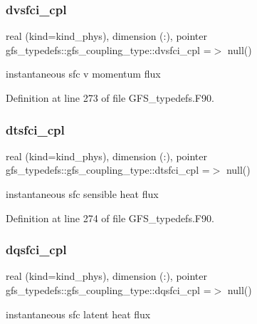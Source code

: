 \subsubsection{dvsfci\+\_\+cpl}
{\footnotesize\ttfamily real (kind=kind\+\_\+phys), dimension (\+:), pointer gfs\+\_\+typedefs\+::gfs\+\_\+coupling\+\_\+type\+::dvsfci\+\_\+cpl =$>$ null()}



instantaneous sfc v momentum flux 



Definition at line 273 of file G\+F\+S\+\_\+typedefs.\+F90.

\mbox{\label{structgfs__typedefs_1_1gfs__coupling__type_a020368408935772be27eaa098c17ce2e}} 
\subsubsection{dtsfci\+\_\+cpl}
{\footnotesize\ttfamily real (kind=kind\+\_\+phys), dimension (\+:), pointer gfs\+\_\+typedefs\+::gfs\+\_\+coupling\+\_\+type\+::dtsfci\+\_\+cpl =$>$ null()}



instantaneous sfc sensible heat flux 



Definition at line 274 of file G\+F\+S\+\_\+typedefs.\+F90.

\mbox{\label{structgfs__typedefs_1_1gfs__coupling__type_a86ca0a5891940de32f482ad187d8145d}} 
\subsubsection{dqsfci\+\_\+cpl}
{\footnotesize\ttfamily real (kind=kind\+\_\+phys), dimension (\+:), pointer gfs\+\_\+typedefs\+::gfs\+\_\+coupling\+\_\+type\+::dqsfci\+\_\+cpl =$>$ null()}



instantaneous sfc latent heat flux 



